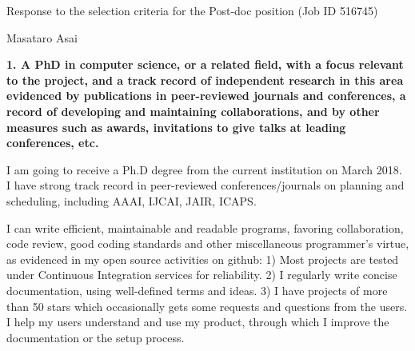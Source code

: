 \documentclass[12pt]{article}
\begin{document}
{
\large
Response to the selection criteria for the Post-doc position (Job ID 516745)\\
}

Masataro Asai

% 

\setlength{\parskip}{0.3em}




\textbf{1. A PhD in computer science, or a related field, with a focus
relevant to the project, and a track record of independent research in
this area evidenced by publications in peer-reviewed journals and
conferences, a record of developing and maintaining collaborations, and
by other measures such as awards, invitations to give talks at leading
conferences, etc.}

I am going to receive a Ph.D degree from the current institution on March 2018.
I have strong track record in peer-reviewed conferences/journals on planning and scheduling,
including AAAI, IJCAI, JAIR, ICAPS.

I can write efficient, maintainable and readable programs,
favoring collaboration, code review, good coding standards and other miscellaneous programmer's virtue,
as evidenced in my open source activities on github:
1) Most projects are tested under Continuous Integration services for reliability.
2) I regularly write concise documentation, using well-defined terms and ideas.
3) I have projects of more than 50 stars which occasionally gets some requests and questions from the users.
 I help my users understand and use my product, through which I improve the documentation or the setup process.
\end{document}
